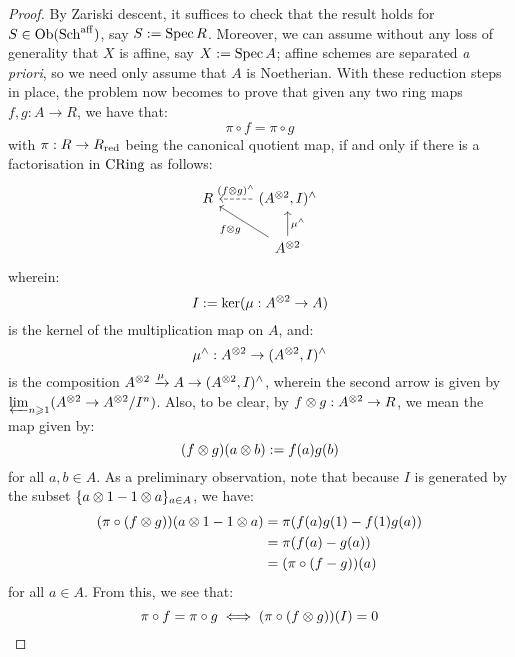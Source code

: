             \begin{proof}
                By Zariski descent, it suffices to check that the result holds for $S \in \mathrm{Ob}(\mathrm{Sch}^{\mathrm{aff}})$, say $S := \operatorname{Spec} R$. Moreover, we can assume without any loss of generality that $X$ is affine, say $X := \operatorname{Spec} A$; affine schemes are separated \textit{a priori}, so we need only assume that $A$ is Noetherian. With these reduction steps in place, the problem now becomes to prove that given any two ring maps $f, g: A \to R$, we have that:
                    $$\pi \circ f = \pi \circ g$$
                with $\pi: R \to R_{\mathrm{red}}$ being the canonical quotient map, if and only if there is a factorisation in $\mathrm{CRing}$ as follows:
                    \begin{equation} \label{diagram: formal_neighbourhood_of_diagonal_algebraic}
                        \begin{tikzcd}
                        R & {(A^{\tensor 2}, I)^{\wedge}} \\
                        & {A^{\tensor 2}}
                        \arrow["{(f \tensor g)^{\wedge}}"', dashed, from=1-2, to=1-1]
                        \arrow["{f \tensor g}", from=2-2, to=1-1]
                        \arrow["{\mu^{\wedge}}"', from=2-2, to=1-2]
                        \end{tikzcd}
                    \end{equation}
                wherein:
                    $$I := \ker(\mu: A^{\tensor 2} \to A)$$
                is the kernel of the multiplication map on $A$, and:
                    $$\mu^{\wedge}: A^{\tensor 2} \to (A^{\tensor 2}, I)^{\wedge}$$
                is the composition $A^{\tensor 2} \xrightarrow[]{\mu} A \to (A^{\tensor 2}, I)^{\wedge}$, wherein the second arrow is given by $\projlim_{n \geq 1} (A^{\tensor 2} \to A^{\tensor 2}/I^n)$. Also, to be clear, by $f \tensor g: A^{\tensor 2} \to R$, we mean the map given by:
                    $$(f \tensor g)(a \tensor b) := f(a) g(b)$$
                for all $a, b \in A$. As a preliminary observation, note that because $I$ is generated by the subset $\{a \tensor 1 - 1 \tensor a\}_{a \in A}$, we have:
                    \begin{equation} \label{equation: difference_of_points_along_diagonal}
                        \begin{aligned}
                            (\pi \circ (f \tensor g))(a \tensor 1 - 1 \tensor a) & = \pi(f(a) g(1) - f(1) g(a))
                            \\
                            & = \pi(f(a) - g(a))
                            \\
                            & = (\pi \circ (f - g))(a)
                        \end{aligned}
                    \end{equation}
                for all $a \in A$. From this, we see that:
                    $$\pi \circ f = \pi \circ g \iff (\pi \circ (f \tensor g))(I) = 0$$


\end{proof}
